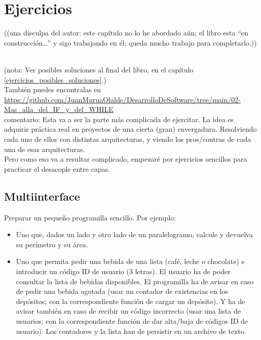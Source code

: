 \documentclass[spanish,12pt,a4paper,final,oneside]{book}
\begin{document}
\chapter{Ejercicios}\label{ejercicios_organizacion}

\begin{footnotesize}((una disculpa del autor: este capítulo no lo he abordado aún; el libro esta ``en construcción\ldots'' y sigo trabajando en él; queda mucho trabajo para completarlo.))\end{footnotesize}
\\

(nota: Ver posibles soluciones al final del libro, en el capítulo \ref{ejercicios_posibles_soluciones}.)
\\{\scriptsize También puedes encontralas en \url{https://github.com/JuanMuruaOlalde/DesarrolloDeSoftware/tree/main/02-Mas_alla_del_IF_y_del_WHILE}}
\\

comentario: Esta va a ser la parte más complicada de ejercitar. La idea es adquirir práctica real en proyectos de una cierta (gran) envergadura. Resolviendo cada uno de ellos con distintas arquitecturas, y viendo los pros/contras de cada una de esas arquitecturas.
\\Pero como eso va a resultar complicado, empezaré por ejercicios sencillos para practicar el desacople entre capas.


\section{Multiinterface}\label{ejercicio_multiinterface}

Preparar un pequeño programilla sencillo. Por ejemplo:
\begin{itemize}
\item Uno que, dados un lado y otro lado de un paralelogramo, calcule y devuelva su perímetro y su área.
\item Uno que permita pedir una bebida de una lista (café, leche o chocolate) e introducir un código {\footnotesize ID} de usuario (3 letras). El usuario ha de poder consultar la lista de bebidas disponibles. El programilla ha de avisar en caso de pedir una bebida agotada (usar un contador de existencias en los depósitos; con la correspondiente función de cargar un depósito). Y ha de avisar también en caso de recibir un código incorrecto (usar una lista de usuarios; con la correspondiente función de dar alta/baja de códigos {\footnotesize ID} de usuario). Los contadores y la lista han de persistir en un archivo de texto. 
\end{itemize}
\end{document}
